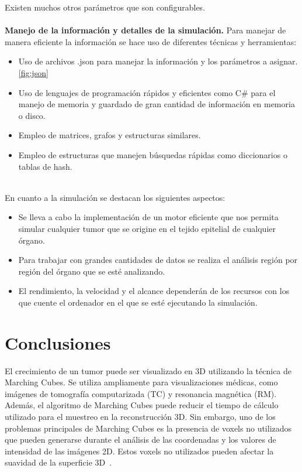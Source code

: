 \documentclass[a4paper,11pt]{article}
\begin{document}
{Existen muchos otros par\'ametros que son configurables.\\
\\
\textbf{Manejo de la informaci\'on y detalles de la simulaci\'on.}
Para manejar de manera eficiente la informaci\'on se hace uso de diferentes t\'ecnicas y herramientas:
\begin{itemize}
    \item Uso de archivos .json para manejar la información y los parámetros a asignar.\ref{fig:json}
    \item Uso de lenguajes de programación rápidos y eficientes como C# para el manejo de memoria y guardado de gran cantidad de información en memoria o disco.
    \item Empleo de matrices, grafos y estructuras similares.
    \item Empleo de estructuras que manejen búsquedas rápidas como diccionarios o tablas de hash.
\end{itemize}
\\
En cuanto a la simulaci\'on se destacan los siguientes aspectos:
\begin{itemize}
    \item Se lleva a cabo la implementación de un motor eficiente que nos permita simular cualquier tumor que se origine en el tejido epitelial de cualquier órgano.
    \item Para trabajar con grandes cantidades de datos se realiza el análisis región por región del órgano que se esté analizando.
    \item El rendimiento, la velocidad y el alcance dependerán de los recursos con los que cuente el ordenador en el que se esté ejecutando la simulación.
\end{itemize}
\section*{Conclusiones}

El crecimiento de un tumor puede ser visualizado en 3D utilizando la técnica de Marching Cubes. Se utiliza ampliamente para visualizaciones médicas, como imágenes de tomografía computarizada (TC) y resonancia magnética (RM). Además, el algoritmo de Marching Cubes puede reducir el tiempo de cálculo utilizado para el muestreo en la reconstrucción 3D. Sin embargo, uno de los problemas principales de Marching Cubes es la presencia de voxels no utilizados que pueden generarse durante el análisis de las coordenadas y los valores de intensidad de las imágenes 2D. Estos voxels no utilizados pueden afectar la suavidad de la superficie 3D~\cite{8}.

}
\end{document}

